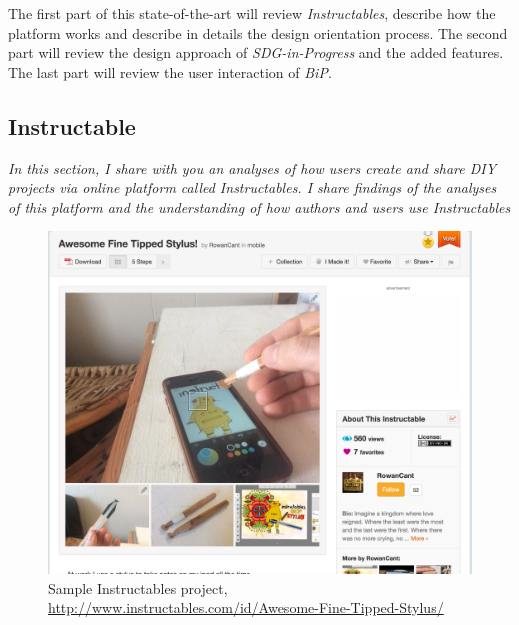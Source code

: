 The first part of this state-of-the-art will review \textit{Instructables}, describe how the platform works and describe in details the design orientation process. The second part will review the design approach of \textit{SDG-in-Progress} and the added features. The last part will review the user interaction of \textit{BiP}. 



\subsection{Instructable}


\begin{center}
	\begin{minipage}{.7\textwidth}
		\textit{In this section, I share with you an analyses of how users create and share \textit{DIY} projects via online platform called Instructables. I share findings of the analyses of this platform and the understanding of how authors and users use Instructables}
	\end{minipage}
\end{center}

\begin{figure}[ht!]
	\includegraphics[scale=0.36]{./images/img-instructables.png}
	\caption{Sample Instructables project, \url{http://www.instructables.com/id/Awesome-Fine-Tipped-Stylus/}}
	\label{sec:img-instructables}
\end{figure}

